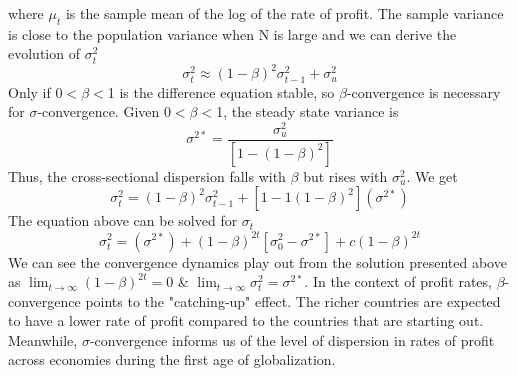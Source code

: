 \documentclass[10pt]{article}
\begin{document}
where $\mu_{t}$ is the sample mean of the log of the rate of profit. The sample variance is close to the population variance when N is large and we can derive the evolution of $\sigma^{2}_{t}$
\begin{equation*}
    \sigma_{t}^{2} \approx (1-\beta)^{2} \sigma^{2}_{t-1} + \sigma^{2}_{u}
\end{equation*}
Only if 0$<\beta<$1 is the difference equation stable, so $\beta$-convergence is necessary for $\sigma$-convergence. Given 0$<\beta<$1, the steady state variance is 
\begin{equation*}
    \sigma^{2*} = \frac{\sigma^{2}_{u}}{[1-(1-\beta)^{2}]}
\end{equation*} 
Thus, the cross-sectional dispersion falls with $\beta$ but rises with $\sigma^{2}_{u}$. We get 
\begin{equation*}
    \sigma_{t}^{2} = (1-\beta)^{2}\sigma^{2}_{t-1} + [1-1(1-\beta)^{2}](\sigma^{2*})
\end{equation*}
The equation above can be solved for $\sigma_{t}$
\begin{equation*}
    \sigma^{2}_{t} = (\sigma^{2*}) + (1-\beta)^{2t}[\sigma^{2}_{0}-\sigma^{2*}] + c(1-\beta)^{2t}
\end{equation*}
We can see the convergence dynamics play out from the solution presented above as $\lim_{t \to \infty} (1-\beta)^{2t} = 0$ \& $\lim_{t \to \infty} \sigma^{2}_{t} = \sigma^{2*}$. In the context of profit rates, $\beta$- convergence points to the "catching-up" effect. The richer countries are expected to have a lower rate of profit compared to the countries that are starting out. Meanwhile, $\sigma$-convergence informs us of the level of dispersion in rates of profit across economies during the first age of globalization. 
\end{document}
